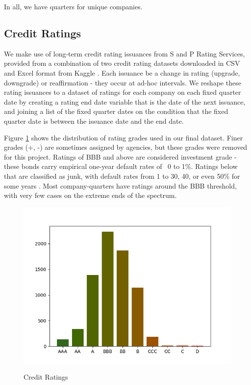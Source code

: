 \documentclass{article}[11pt]
\begin{document}
    In all, we have \numQuarters \space quarters for \numCompanies \space unique companies.

    \subsection*{Credit Ratings}

    We make use of long-term credit rating issuances from S and P Rating Services, provided from a combination of two credit rating datasets downloaded in CSV and Excel format from Kaggle \citep{gewerc_corporate_2020,makwana_corporate_2022}. Each issuance be a change in rating (upgrade, downgrade) or reaffirmation - they occur at ad-hoc intervals. We reshape these rating issuances to a dataset of ratings for each company on each fixed quarter date by creating a rating end date variable that is the date of the next issuance, and joining a list of the fixed quarter dates on the condition that the fixed quarter date is between the issuance date and the end date.

    Figure \ref{fig:credit-ratings} shows the distribution of rating grades used in our final dataset. Finer grades (+, -) are sometimes assigned by agencies, but these grades were removed for this project. Ratings of BBB and above are considered investment grade - these bonds carry empirical one-year default rates of ~0 to 1\%. Ratings below that are classified as junk, with default rates from 1 to 30, 40, or even 50\% for some years \citep{s_and_p_global_ratings_s_2024}. Most company-quarters have ratings around the BBB threshold, with very few cases on the extreme ends of the spectrum.

    \begin{figure}[h!]
		\centering
        \caption{Credit Ratings}
        \includegraphics[width=0.5\linewidth,keepaspectratio=true]{../Output/All Data EDA/Tabular EDA/Distribution of Rating Issuances_no_title.png}
        \label{fig:credit-ratings}
	\end{figure}
\end{document}
